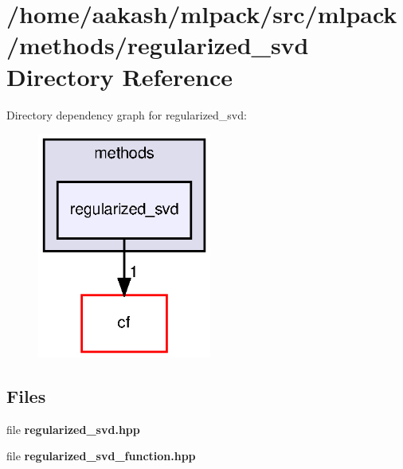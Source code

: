 \section{/home/aakash/mlpack/src/mlpack/methods/regularized\+\_\+svd Directory Reference}
\label{dir_e93dcd612dcd8a362b106dc4ba1d7add}
Directory dependency graph for regularized\+\_\+svd\+:
\nopagebreak
\begin{figure}[H]
\begin{center}
\leavevmode
\includegraphics[width=162pt]{dir_e93dcd612dcd8a362b106dc4ba1d7add_dep}
\end{center}
\end{figure}
\subsection*{Files}
\begin{DoxyCompactItemize}
\item 
file \textbf{ regularized\+\_\+svd.\+hpp}
\item 
file \textbf{ regularized\+\_\+svd\+\_\+function.\+hpp}
\end{DoxyCompactItemize}
